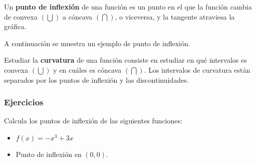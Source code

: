 \begin{definition}
Un \textbf{punto de inflexión} de una función es un punto en el que la función cambia de convexa $(\bigcup)$ a cóncava $(\bigcap)$, o viceversa, y la tangente atraviesa la gráfica.
\end{definition}
A continuación se muestra un ejemplo de punto de inflexión.


\begin{definition}
Estudiar la \textbf{curvatura} de una función consiste en estudiar en qué intervalos es convexa $(\bigcup)$ y en cuáles es cóncava $(\bigcap)$. Los intervalos de curvatura están separados por los puntos de inflexión y las discontinuidades.
\end{definition}

\subsubsection{Ejercicios}
\begin{ex}
	Calcula los puntos de inflexión de las siguientes funciones:\\
	\begin{itemize}
		\item $f(x)=-x^3+3x$
	\end{itemize}
	\begin{sol}
		\begin{itemize}
			\item Punto de inflexión en $(0,0)$.
		\end{itemize}
	\end{sol}
\end{ex}



